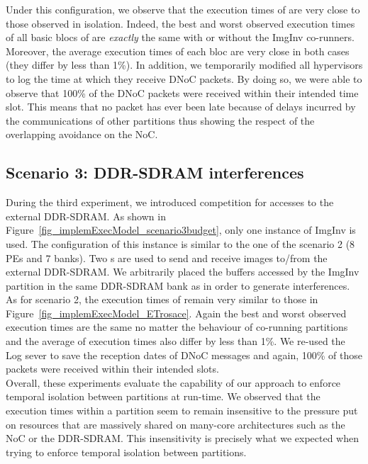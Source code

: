 \documentclass[main.tex]{subfiles}
\begin{document}
Under this configuration, we observe that the execution times of \rosace are
very close to those observed in isolation. Indeed, the best and worst observed
execution times of all basic blocs of \rosace are \emph{exactly} the same with
or without the ImgInv co-runners. Moreover, the average execution times of each
bloc are very close in both cases (they differ by less than 1\%). In addition,
we temporarily modified all hypervisors to log the time at which they receive
DNoC packets. By doing so, we were able to observe that 100\% of the DNoC
packets were received within their intended time slot. This means that no
packet has ever been late because of delays incurred by the communications of
other partitions thus showing the respect of the overlapping avoidance on the
NoC.

\subsection{Scenario 3: DDR-SDRAM interferences}
During the third experiment, we introduced competition for accesses to the
external DDR-SDRAM. As shown in
Figure~\ref{fig_implemExecModel_scenario3budget}, only one instance of ImgInv
is used. The \PN{} configuration of this instance is similar to the one of the
scenario 2 (8 PEs and 7 banks). Two \PC{}s are used to send and receive images
to/from the external DDR-SDRAM. We arbitrarily placed the buffers accessed by
the ImgInv partition in the same DDR-SDRAM bank as \rosace in order to generate
interferences. As for scenario 2, the execution times of \rosace remain very
similar to those in Figure~\ref{fig_implemExecModel_ETrosace}. Again the best
and worst observed execution times are the same no matter the behaviour of
co-running partitions and the average of execution times also differ by less
than 1\%. We re-used the Log sever to save the reception dates of DNoC messages
and again, 100\% of those packets were received within their intended slots. \\

Overall, these experiments evaluate the capability of our approach to enforce
temporal isolation between partitions at run-time. We observed that the
execution times within a partition seem to remain insensitive to the pressure
put on resources that are massively shared on many-core architectures such as
the NoC or the DDR-SDRAM. This insensitivity is precisely what we expected when
trying to enforce temporal isolation between partitions. \\
\end{document}
